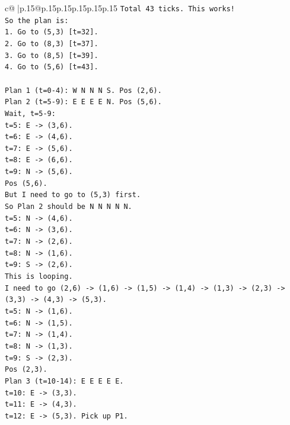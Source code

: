 \documentclass{article}
\begin{document}
{\begin{supertabular}{c@{$\;$}|p{.15\linewidth}@{}p{.15\linewidth}p{.15\linewidth}p{.15\linewidth}p{.15\linewidth}p{.15\linewidth}}
{{{\texttt{Total 43 ticks. This works!} \\
\texttt{So the plan is:} \\
\texttt{1. Go to (5,3) {[}t=32{]}.} \\
\texttt{2. Go to (8,3) {[}t=37{]}.} \\
\texttt{3. Go to (8,5) {[}t=39{]}.} \\
\texttt{4. Go to (5,6) {[}t=43{]}.} \\
\\ 
\texttt{Plan 1 (t=0{-}4): W N N N S. Pos (2,6).} \\
\texttt{Plan 2 (t=5{-}9): E E E E N. Pos (5,6).} \\
\texttt{Wait, t=5{-}9:} \\
\texttt{t=5: E {-}> (3,6).} \\
\texttt{t=6: E {-}> (4,6).} \\
\texttt{t=7: E {-}> (5,6).} \\
\texttt{t=8: E {-}> (6,6).} \\
\texttt{t=9: N {-}> (5,6).} \\
\texttt{Pos (5,6).} \\
\texttt{But I need to go to (5,3) first.} \\
\texttt{So Plan 2 should be N N N N N.} \\
\texttt{t=5: N {-}> (4,6).} \\
\texttt{t=6: N {-}> (3,6).} \\
\texttt{t=7: N {-}> (2,6).} \\
\texttt{t=8: N {-}> (1,6).} \\
\texttt{t=9: S {-}> (2,6).} \\
\texttt{This is looping.} \\
\texttt{I need to go (2,6) {-}> (1,6) {-}> (1,5) {-}> (1,4) {-}> (1,3) {-}> (2,3) {-}> (3,3) {-}> (4,3) {-}> (5,3).} \\
\texttt{t=5: N {-}> (1,6).} \\
\texttt{t=6: N {-}> (1,5).} \\
\texttt{t=7: N {-}> (1,4).} \\
\texttt{t=8: N {-}> (1,3).} \\
\texttt{t=9: S {-}> (2,3).} \\
\texttt{Pos (2,3).} \\
\texttt{Plan 3 (t=10{-}14): E E E E E.} \\
\texttt{t=10: E {-}> (3,3).} \\
\texttt{t=11: E {-}> (4,3).} \\
\texttt{t=12: E {-}> (5,3). Pick up P1.} \\
}}}
\end{supertabular}}
\end{document}
